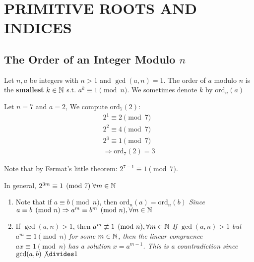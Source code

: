 \chapter{PRIMITIVE ROOTS AND INDICES}

\section{The Order of an Integer Modulo $n$}

\setcounter{definition}{0}
\setcounter{theorem}{0}

\begin{definition}
    Let $n, a$ be integers with $n>1$ and $\gcd(a, n) = 1$.
    The order of $a$ modulo $n$ is the \textbf{smallest} $k \in \mathbb{N}$ s.t. $a^k \equiv 1 \pmod n$.
    We sometimes denote $k$ by $\text{ord}_n(a)$
\end{definition}
\begin{eg}
    Let $n = 7$ and $a = 2$, We compute $\text{ord}_7(2)$:
    \[
        \begin{aligned}
            2^1 \equiv 2 \pmod 7 \\
            2^2 \equiv 4 \pmod 7 \\
            2^3 \equiv 1 \pmod 7 \\
            \Rightarrow \text{ord}_7(2) = 3
        \end{aligned}
    \]

    Note that by Fermat's little theorem: $2^{7-1} \equiv 1 \pmod 7$.

    In general, $2^{3m} \equiv 1 \pmod 7 \; \forall m \in \mathbb{N}$
\end{eg}
\begin{remark}
    \begin{enumerate}
        \item Note that if $a \equiv b \pmod n$, then $\text{ord}_n(a) = \text{ord}_n(b)$\newline
        \emph{Since $a \equiv b \pmod n \Rightarrow a^m \equiv b^m \pmod n , \forall m \in \mathbb{N}$}

        \item If $\gcd(a, n) > 1$, then $a^m \not\equiv 1 \pmod n, \forall m \in \mathbb{N}$\newline
        \emph{If $\gcd(a, n) > 1$ but $a^m \equiv 1 \pmod n$ for some $m \in \mathbb{N}$, then
        the linear congruence $ax \equiv 1 \pmod n$ has a solution $x = a^{m-1}$. This is a countradiction
        since $\gcd(a, b) \not \divides 1$}
    \end{enumerate}
\end{remark}

